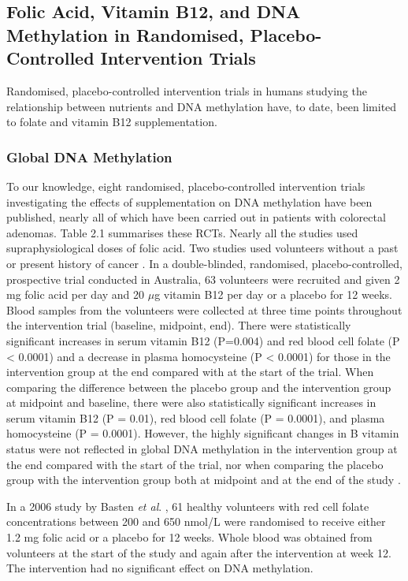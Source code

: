 \subsection{Folic Acid, Vitamin B12, and DNA Methylation in Randomised, Placebo-Controlled Intervention Trials} %
\noindent Randomised, placebo-controlled intervention trials in humans studying the relationship between nutrients and DNA methylation have, to date, been limited to folate and vitamin B12 supplementation. 
 
\subsubsection{Global DNA Methylation} %
\noindent To our knowledge, eight randomised, placebo-controlled intervention trials investigating the effects of supplementation on DNA methylation have been published, nearly all of which have been carried out in patients with colorectal adenomas. Table 2.1 summarises these RCTs. Nearly all the studies used supraphysiological doses of folic acid. Two studies used volunteers without a past or present history of cancer \cite{c251,c252}. In a double-blinded, randomised, placebo-controlled, prospective trial conducted in Australia, 63 volunteers were recruited and given 2 mg folic acid per day and 20 $\mu$g vitamin B12 per day or a placebo for 12 weeks. Blood samples from the volunteers were collected at three time points throughout the intervention trial (baseline, midpoint, end). There were statistically significant increases in serum vitamin B12 (P=0.004) and red blood cell folate (P < 0.0001) and a decrease in plasma homocysteine (P < 0.0001) for those in the intervention group at the end compared with at 
the start of the trial. When comparing the difference between the placebo group and the intervention group at midpoint and baseline, there were also statistically significant increases in serum vitamin B12 (P = 0.01), red blood cell folate (P = 0.0001), and plasma homocysteine (P = 0.0001). However, the highly significant changes in B vitamin status were not reflected in global DNA methylation in the intervention group at the end compared with the start of the trial, nor when comparing the placebo group with the intervention group both at midpoint and at the end of the study \cite{c252}. 
 
\noindent In a 2006 study by Basten \emph{et al}. \cite{c251}, 61 healthy volunteers with red cell folate concentrations between 200 and 650 nmol/L were randomised to receive either 1.2 mg folic acid or a placebo for 12 weeks. Whole blood was obtained from volunteers at the start of the study and again after the intervention at week 12. The intervention had no significant effect on DNA methylation. 
 
